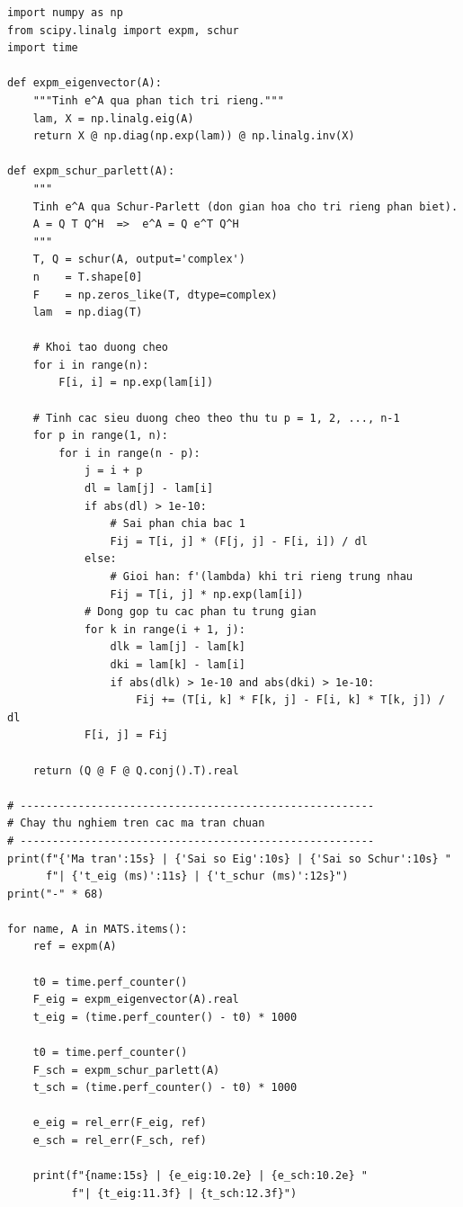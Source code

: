 \documentclass[12pt,a4paper]{report}
\begin{document}
\begin{lstlisting}[style=python, caption={Thực nghiệm 1: so sánh phương pháp trị riêng vs Schur-Parlett}]
import numpy as np
from scipy.linalg import expm, schur
import time

def expm_eigenvector(A):
    """Tinh e^A qua phan tich tri rieng."""
    lam, X = np.linalg.eig(A)
    return X @ np.diag(np.exp(lam)) @ np.linalg.inv(X)

def expm_schur_parlett(A):
    """
    Tinh e^A qua Schur-Parlett (don gian hoa cho tri rieng phan biet).
    A = Q T Q^H  =>  e^A = Q e^T Q^H
    """
    T, Q = schur(A, output='complex')
    n    = T.shape[0]
    F    = np.zeros_like(T, dtype=complex)
    lam  = np.diag(T)

    # Khoi tao duong cheo
    for i in range(n):
        F[i, i] = np.exp(lam[i])

    # Tinh cac sieu duong cheo theo thu tu p = 1, 2, ..., n-1
    for p in range(1, n):
        for i in range(n - p):
            j = i + p
            dl = lam[j] - lam[i]
            if abs(dl) > 1e-10:
                # Sai phan chia bac 1
                Fij = T[i, j] * (F[j, j] - F[i, i]) / dl
            else:
                # Gioi han: f'(lambda) khi tri rieng trung nhau
                Fij = T[i, j] * np.exp(lam[i])
            # Dong gop tu cac phan tu trung gian
            for k in range(i + 1, j):
                dlk = lam[j] - lam[k]
                dki = lam[k] - lam[i]
                if abs(dlk) > 1e-10 and abs(dki) > 1e-10:
                    Fij += (T[i, k] * F[k, j] - F[i, k] * T[k, j]) / dl
            F[i, j] = Fij

    return (Q @ F @ Q.conj().T).real

# -------------------------------------------------------
# Chay thu nghiem tren cac ma tran chuan
# -------------------------------------------------------
print(f"{'Ma tran':15s} | {'Sai so Eig':10s} | {'Sai so Schur':10s} "
      f"| {'t_eig (ms)':11s} | {'t_schur (ms)':12s}")
print("-" * 68)

for name, A in MATS.items():
    ref = expm(A)

    t0 = time.perf_counter()
    F_eig = expm_eigenvector(A).real
    t_eig = (time.perf_counter() - t0) * 1000

    t0 = time.perf_counter()
    F_sch = expm_schur_parlett(A)
    t_sch = (time.perf_counter() - t0) * 1000

    e_eig = rel_err(F_eig, ref)
    e_sch = rel_err(F_sch, ref)

    print(f"{name:15s} | {e_eig:10.2e} | {e_sch:10.2e} "
          f"| {t_eig:11.3f} | {t_sch:12.3f}")
\end{lstlisting}
\end{document}

